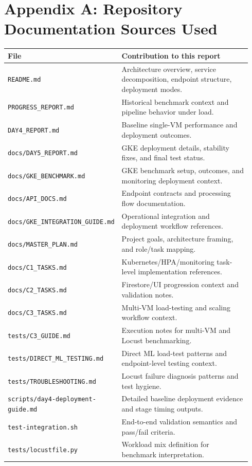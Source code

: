 \documentclass[11pt,a4paper]{article}
\begin{document}
\section*{Appendix A: Repository Documentation Sources Used}
\begin{longtable}{p{0.32\linewidth}p{0.62\linewidth}}
\toprule
\textbf{File} & \textbf{Contribution to this report} \\
\midrule
\endhead
\texttt{README.md} & Architecture overview, service decomposition, endpoint structure, deployment modes. \\
\texttt{PROGRESS\_REPORT.md} & Historical benchmark context and pipeline behavior under load. \\
\texttt{DAY4\_REPORT.md} & Baseline single-VM performance and deployment outcomes. \\
\texttt{docs/DAY5\_REPORT.md} & GKE deployment details, stability fixes, and final test status. \\
\texttt{docs/GKE\_BENCHMARK.md} & GKE benchmark setup, outcomes, and monitoring deployment context. \\
\texttt{docs/API\_DOCS.md} & Endpoint contracts and processing flow documentation. \\
\texttt{docs/GKE\_INTEGRATION\_GUIDE.md} & Operational integration and deployment workflow references. \\
\texttt{docs/MASTER\_PLAN.md} & Project goals, architecture framing, and role/task mapping. \\
\texttt{docs/C1\_TASKS.md} & Kubernetes/HPA/monitoring task-level implementation references. \\
\texttt{docs/C2\_TASKS.md} & Firestore/UI progression context and validation notes. \\
\texttt{docs/C3\_TASKS.md} & Multi-VM load-testing and scaling workflow context. \\
\texttt{tests/C3\_GUIDE.md} & Execution notes for multi-VM and Locust benchmarking. \\
\texttt{tests/DIRECT\_ML\_TESTING.md} & Direct ML load-test patterns and endpoint-level testing context. \\
\texttt{tests/TROUBLESHOOTING.md} & Locust failure diagnosis patterns and test hygiene. \\
\texttt{scripts/day4-deployment-guide.md} & Detailed baseline deployment evidence and stage timing outputs. \\
\texttt{test-integration.sh} & End-to-end validation semantics and pass/fail criteria. \\
\texttt{tests/locustfile.py} & Workload mix definition for benchmark interpretation. \\
\bottomrule
\end{longtable}
\end{document}
